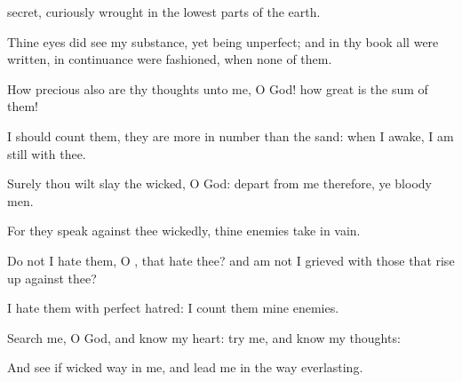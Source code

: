 {secret,
{} curiously
wrought in the lowest
parts of the
earth.
\par }{\Q {}Thine
eyes did
see my substance, yet being
unperfect; and in thy
book all
{} were
written,
{} in
continuance were
fashioned, when
{}
none of them.
\par }{\BB \par }{\Q {}How
precious also are thy
thoughts unto me, O
God! how
great is the
sum of them!
\par }{\Q {} I should
count them, they are more in
number than the
sand: when I
awake, I am
still with thee.
\par }{\Q {}Surely thou wilt
slay the
wicked, O
God:
depart from me therefore, ye
bloody
men.
\par }{\Q {}For they
speak against thee
wickedly,
{} thine
enemies
take
{} in
vain.
\par }{\Q {}Do not I
hate them, O
{}, that
hate thee? and am not I
grieved with those that rise
up against thee?
\par }{\Q {}I
hate them with
perfect
hatred: I count them mine
enemies.
\par }{\Q {}Search me, O
God, and
know my
heart:
try me, and
know my
thoughts:
\par }{\Q {}And
see if
{}
wicked
way in me, and
lead me in the
way
everlasting.

}
